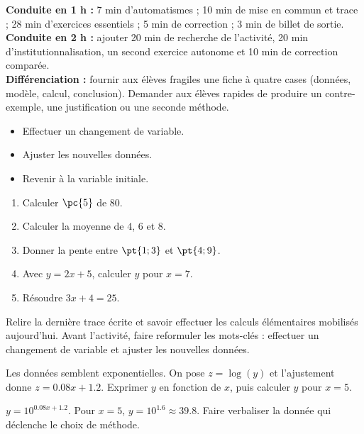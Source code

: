 \ifmxteacher
\begin{method}
\textbf{Conduite en 1 h :} 7 min d'automatismes ; 10 min de mise en commun et trace ; 28 min d'exercices essentiels ; 5 min de correction ; 3 min de billet de sortie.\\
\textbf{Conduite en 2 h :} ajouter 20 min de recherche de l'activité, 20 min d'institutionnalisation, un second exercice autonome et 10 min de correction comparée.\\
\textbf{Différenciation :} fournir aux élèves fragiles une fiche à quatre cases (données, modèle, calcul, conclusion). Demander aux élèves rapides de produire un contre-exemple, une justification ou une seconde méthode.
\end{method}
\fi
{}
\begin{objectives}\begin{itemize}\item Effectuer un changement de variable.\item Ajuster les nouvelles données.\item Revenir à la variable initiale.\end{itemize}\end{objectives}
\begin{fluency}\begin{enumerate}\item Calculer $\pc{5}$ de $80$. \item Calculer la moyenne de $4$, $6$ et $8$. \item Donner la pente entre $\pt{1;3}$ et $\pt{4;9}$. \item Avec $y=2x+5$, calculer $y$ pour $x=7$. \item Résoudre $3x+4=25$. \end{enumerate}\end{fluency}
\begin{prerequisites}Relire la dernière trace écrite et savoir effectuer les calculs élémentaires mobilisés aujourd'hui. Avant l'activité, faire reformuler les mots-clés : effectuer un changement de variable et ajuster les nouvelles données.\end{prerequisites}

\begin{activity}
Les données semblent exponentielles. On pose $z=\log(y)$ et l'ajustement donne $z=\num{0,08}x+\num{1,2}$. Exprimer $y$ en fonction de $x$, puis calculer $y$ pour $x=5$.

\end{activity}
\begin{solution}$y=10^{\num{0,08}x+\num{1,2}}$. Pour $x=5$, $y=10^{\num{1,6}}\approx\num{39,8}$. Faire verbaliser la donnée qui déclenche le choix de méthode.\end{solution}

